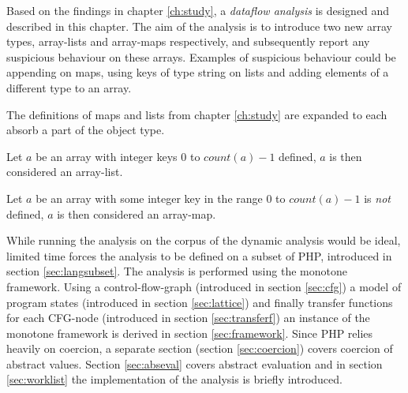 Based on the findings in chapter \ref{ch:study}, a \emph{dataflow analysis} is designed and described in this chapter. The aim of the analysis is to introduce two new array types, array-lists and array-maps respectively, and subsequently report any suspicious behaviour on these arrays. Examples of suspicious behaviour could be appending on maps, using keys of type string on lists and adding elements of a different type to an array.

The definitions of maps and lists from chapter \ref{ch:study} are expanded to each absorb a part of the object type.

\begin{definition}
Let $a$ be an array with integer keys $0$ to $count(a)-1$ defined, $a$ is then considered an array-list.
\end{definition}

\begin{definition}
Let $a$ be an array with some integer key in the range $0$ to $count(a)-1$ is \emph{not} defined, $a$ is then considered an array-map.
\end{definition}

While running the analysis on the corpus of the dynamic analysis would be ideal, limited time forces the analysis to be defined on a subset of PHP, introduced in section \ref{sec:langsubset}. The analysis is performed using the monotone framework. Using a control-flow-graph (introduced in section \ref{sec:cfg}) a model of program states (introduced in section \ref{sec:lattice}) and finally transfer functions for each CFG-node (introduced in section \ref{sec:transferf}) an instance of the monotone framework is derived in section \ref{sec:framework}. Since PHP relies heavily on coercion, a separate section (section \ref{sec:coercion}) covers coercion of abstract values. Section \ref{sec:abseval} covers abstract evaluation and in section \ref{sec:worklist} the implementation of the analysis is briefly introduced.
